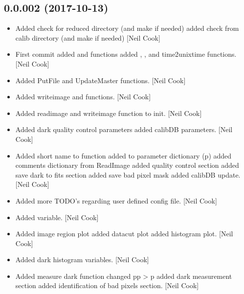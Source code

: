 \documentclass[a4paper,10pt,english]{report}
\begin{document}
\subsection{0.0.002 (2017-10-13)}
\label{\detokenize{misc/changelog:id548}}\begin{itemize}
\item {} 
Added check for reduced directory (and make if needed) added check
from calib directory (and make if needed) {[}Neil Cook{]}

\item {} 
First commit added  and  functions added
, , and time2unixtime
functions. {[}Neil Cook{]}

\item {} 
Added PutFile and UpdateMaster functions. {[}Neil Cook{]}

\item {} 
Added writeimage and  functions. {[}Neil Cook{]}

\item {} 
Added readimage and writeimage function to init. {[}Neil Cook{]}

\item {} 
Added dark quality control parameters added calibDB parameters. {[}Neil
Cook{]}

\item {} 
Added short name to  function added  to
parameter dictionary (p) added comments dictionary from ReadImage
added quality control section added save dark to fits section added
save bad pixel mask added calibDB update. {[}Neil Cook{]}

\item {} 
Added more TODO’s regarding user defined config file. {[}Neil Cook{]}

\item {} 
Added  variable. {[}Neil Cook{]}

\item {} 
Added image region plot added datacut plot added histogram plot. {[}Neil
Cook{]}

\item {} 
Added dark histogram variables. {[}Neil Cook{]}

\item {} 
Added measure dark function changed pp \textendash{}\textgreater{} p added dark measurement
section added identification of bad pixels section. {[}Neil Cook{]}

\end{itemize}
\end{document}

